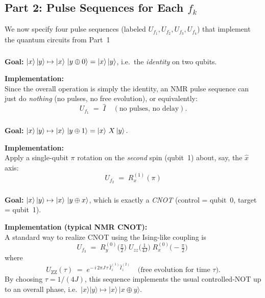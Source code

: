 \documentclass[11pt]{article}
\begin{document}
\subsection*{Part 2: Pulse Sequences for Each \texorpdfstring{$f_k$}{fk}}

We now specify four pulse sequences (labeled $U_{f_1}, U_{f_2}, U_{f_3}, U_{f_4}$)
that implement the quantum circuits from Part~1 

\subsubsection*{}

\textbf{Goal:} 
$\ket{x}\ket{y} \mapsto \ket{x}\,\ket{y\oplus 0} = \ket{x}\ket{y}$,
i.e.\ the \emph{identity} on two qubits.

\textbf{Implementation:}\\
Since the overall operation is simply the identity, 
an NMR pulse sequence can just do \emph{nothing} (no pulses, no free evolution), or equivalently:
\[
  U_{f_1} \;=\; \hat{I} 
  \quad (\text{no pulses, no delay}).
\]

\subsubsection*{}

\textbf{Goal:} 
$\ket{x}\ket{y} \mapsto \ket{x}\,\ket{y\oplus 1} = \ket{x}\,X\ket{y}.$

\textbf{Implementation:}\\
Apply a single-qubit $\pi$ rotation on the \emph{second} spin (qubit~1) about, say, the $\hat{x}$ axis:
\[
  U_{f_2} \;=\; R_{x}^{(1)}(\pi)
\]


\subsubsection*{}

\textbf{Goal:} 
$\ket{x}\ket{y} \mapsto \ket{x}\,\ket{y\oplus x}$,
which is exactly a \emph{CNOT} (control = qubit~0, target = qubit~1).

\textbf{Implementation (typical NMR CNOT):}\\
A standard way to realize \textsc{CNOT} using the Ising-like coupling is
\[
  U_{f_3} \;=\;
    R_{y}^{(0)}\!\bigl(\tfrac{\pi}{2}\bigr)\;
    U_{zz}\!\bigl(\tfrac{1}{4J}\bigr)\;
    R_{x}^{(0)}\!\bigl(-\tfrac{\pi}{2}\bigr)\;
\]
where
\[
  U_{\text{ZZ}}\!(\tau) \;=\; 
  e^{-\,i\,2\pi J\,\tau\,\hat{I}_z^{(1)}\hat{I}_z^{(2)}}
  \quad\text{(free evolution for time $\tau$)}.
\]
By choosing $\tau = 1/(4J)$, 
this sequence implements the usual controlled-NOT up to an overall phase, 
i.e.\ $|x\rangle|y\rangle \mapsto |x\rangle\,|x\oplus y\rangle$. 
\end{document}
